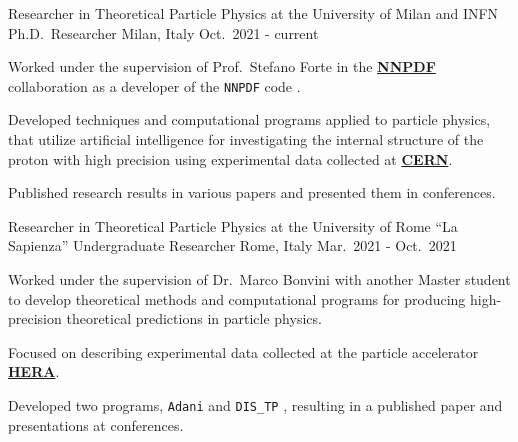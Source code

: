 

\begin{cventries}

  \cventry
  {Researcher in Theoretical Particle Physics at the University of Milan and INFN}
  {Ph.D.\ Researcher}
  {Milan, Italy}
  {Oct.\ 2021 - current}
  {
      \begin{cvitems} %
          \item Worked under the supervision of Prof.\ Stefano Forte in the \href{https://nnpdf.mi.infn.it}{\textbf{NNPDF}} collaboration 
          as a developer of the \texttt{NNPDF} code \href{https://github.com/NNPDF}{\faGithubSquare}.
          \item Developed techniques and computational programs applied to particle physics, that utilize artificial intelligence for 
          investigating the internal structure of the proton with high precision using experimental data collected at \href{https://home.cern}{\textbf{CERN}}.
          \item Published research results in various papers and presented them in conferences.
      \end{cvitems}
    }

    \cventry
{Researcher in Theoretical Particle Physics at the University of Rome ``La Sapienza''}
{Undergraduate Researcher}
{Rome, Italy}
{Mar.\ 2021 - Oct.\ 2021}
{
      \begin{cvitems} %
        \item Worked under the supervision of Dr.\ Marco Bonvini with another Master student to develop theoretical methods and computational programs for producing high-precision theoretical predictions in particle physics.
        \item Focused on describing experimental data collected at the particle accelerator \href{https://en.wikipedia.org/wiki/HERA_(particle_accelerator)}{\textbf{HERA}}.
        \item Developed two programs, \texttt{Adani} \href{https://github.com/niclaurenti/adani}{\faGithubSquare} and \texttt{DIS\_TP} \href{https://github.com/andreab1997/DIS_TP}{\faGithubSquare}, resulting in a published paper and presentations at conferences.
      \end{cvitems}
    }


\end{cventries}